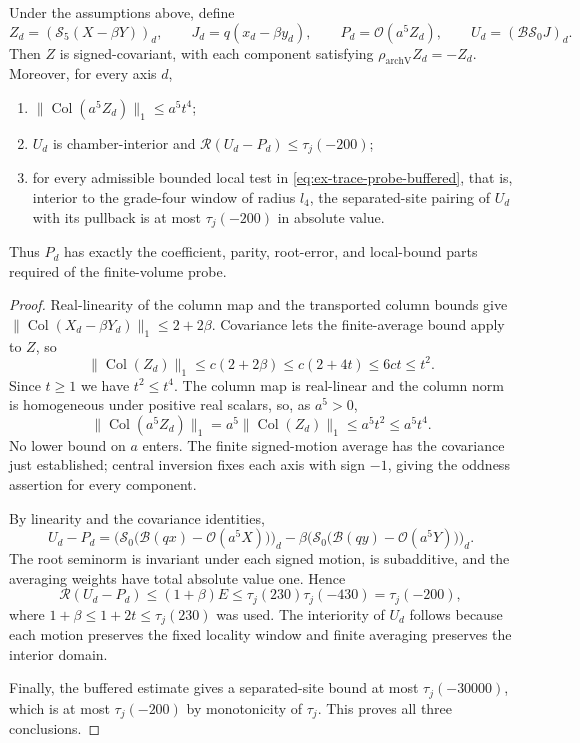 \begin{proposition}
\label{prop:ex-trace-probe-assembly}
Under the assumptions above, define
\[
 Z_d=(\mathscr S_5(X-\beta Y))_d,\qquad
 J_d=q(x_d-\beta y_d),\qquad
 P_d=\mathcal O(a^5 Z_d),\qquad
 U_d=(\mathcal B\mathscr S_0J)_d.
\]
Then $Z$ is signed-covariant, with each component satisfying
$\rho_{\mathrm{archV}}Z_d=-Z_d$. Moreover, for every axis $d$,
\begin{enumerate}
\item $\|\operatorname{Col}(a^5 Z_d)\|_1\leq a^5t^4$;
\item $U_d$ is chamber-interior and
  $\mathcal R(U_d-P_d)\leq\tau_j(-200)$;
\item for every admissible bounded local test in
  \eqref{eq:ex-trace-probe-buffered}, that is, interior to the grade-four
  window of radius $l_4$, the separated-site pairing of $U_d$
  with its pullback is at most $\tau_j(-200)$ in absolute value.
\end{enumerate}
Thus $P_d$ has exactly the coefficient, parity, root-error, and local-bound
parts required of the finite-volume probe.
\end{proposition}
\begin{proof}
Real-linearity of the column map and the transported column bounds give
$\|\operatorname{Col}(X_d-\beta Y_d)\|_1\leq2+2\beta$. Covariance
lets the finite-average bound apply to $Z$, so
\[
 \|\operatorname{Col}(Z_d)\|_1
   \leq c(2+2\beta)\leq c(2+4t)\leq6ct\leq t^2.
\]
Since $t\geq1$ we have $t^2\leq t^4$. The column map is real-linear and
the column norm is homogeneous under positive real scalars, so, as
$a^5>0$,
\[
 \|\operatorname{Col}(a^5Z_d)\|_1=a^5\|\operatorname{Col}(Z_d)\|_1
   \leq a^5t^2\leq a^5t^4.
\]
No lower bound on $a$ enters. The finite signed-motion average has the covariance just established;
central inversion fixes each axis with sign $-1$, giving the oddness
assertion for every component.

By linearity and the covariance identities,
\[
 U_d-P_d=\bigl(\mathscr S_0\bigl(\mathcal B(qx)-\mathcal O(a^5X)\bigr)\bigr)_d
       -\beta\bigl(\mathscr S_0\bigl(\mathcal B(qy)-\mathcal O(a^5Y)\bigr)\bigr)_d.
\]
The root seminorm is invariant under each signed motion, is subadditive,
and the averaging weights have total absolute value one. Hence
\[
 \mathcal R(U_d-P_d)\leq(1+\beta)E
   \leq\tau_j(230)\tau_j(-430)=\tau_j(-200),
\]
where $1+\beta\leq1+2t\leq\tau_j(230)$ was used. The interiority of $U_d$
follows because each motion preserves the fixed locality window and finite
averaging preserves the interior domain.

Finally, the buffered estimate gives a separated-site bound at most
$\tau_j(-30000)$, which is at most $\tau_j(-200)$ by monotonicity of
$\tau_j$. This proves all three conclusions.
\end{proof}

